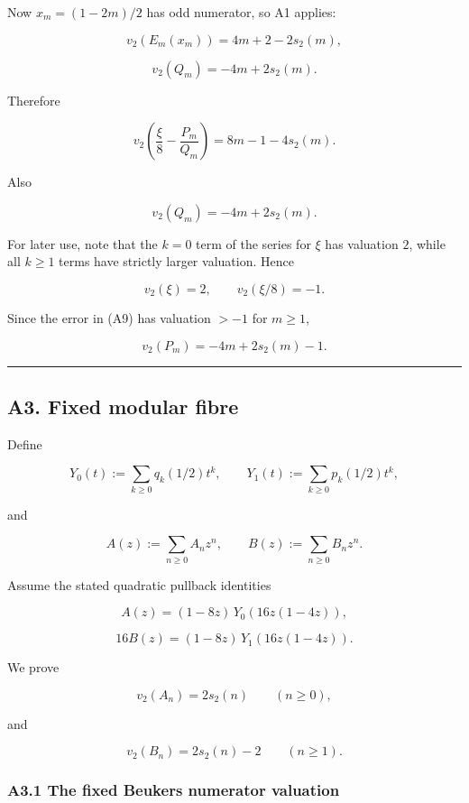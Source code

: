 \documentclass[
  10pt,
  letterpaper,
]{article}
\theoremstyle{definition}
\theoremstyle{remark}
\begin{document}
Now \(x_m=(1-2m)/2\) has odd numerator, so A1 applies:

\[
v_2(E_m(x_m))=4m+2-2s_2(m),
\]

\[
v_2(Q_m)=-4m+2s_2(m).
\]

Therefore

\[
\boxed{
v_2\!\left(
\frac{\xi}{8}-\frac{P_m}{Q_m}
\right)
=
8m-1-4s_2(m).
}
\tag{A9}
\]

Also

\[
\boxed{
v_2(Q_m)=-4m+2s_2(m).
}
\tag{A10}
\]

For later use, note that the \(k=0\) term of the series for \(\xi\) has
valuation \(2\), while all \(k\ge1\) terms have strictly larger
valuation. Hence

\[
v_2(\xi)=2,
\qquad
v_2(\xi/8)=-1.
\tag{A11}
\]

Since the error in (A9) has valuation \(>-1\) for \(m\ge1\),

\[
\boxed{
v_2(P_m)=-4m+2s_2(m)-1.
}
\tag{A12}
\]

\begin{center}\rule{0.5\linewidth}{0.5pt}\end{center}

\subsection{A3. Fixed modular fibre}\label{a3.-fixed-modular-fibre}

Define

\[
Y_0(t):=\sum_{k\ge0}q_k(1/2)t^k,
\qquad
Y_1(t):=\sum_{k\ge0}p_k(1/2)t^k,
\]

and

\[
A(z):=\sum_{n\ge0}A_nz^n,
\qquad
B(z):=\sum_{n\ge0}B_nz^n.
\]

Assume the stated quadratic pullback identities

\[
\boxed{
A(z)
=
(1-8z)\,
Y_0\!\left(16z(1-4z)\right),
}
\tag{A13}
\]

\[
\boxed{
16B(z)
=
(1-8z)\,
Y_1\!\left(16z(1-4z)\right).
}
\tag{A14}
\]

We prove

\[
\boxed{
v_2(A_n)=2s_2(n)\qquad(n\ge0),
}
\tag{A15}
\]

and

\[
\boxed{
v_2(B_n)=2s_2(n)-2\qquad(n\ge1).
}
\tag{A16}
\]

\subsubsection{A3.1 The fixed Beukers numerator
valuation}\label{a3.1-the-fixed-beukers-numerator-valuation}
\end{document}
